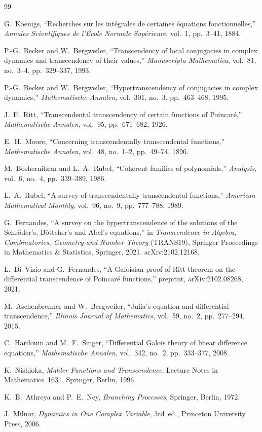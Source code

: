 \documentclass[11pt,a4paper]{article}
\theoremstyle{plain}
\theoremstyle{definition}
\begin{document}
\begin{thebibliography}{99}

G.~Koenigs,
``Recherches sur les int{\'e}grales de certaines {\'e}quations fonctionnelles,''
\textit{Annales Scientifiques de l'{\'E}cole Normale Sup{\'e}rieure},
vol.~1, pp.~3--41, 1884.

P.-G.~Becker and W.~Bergweiler,
``Transcendency of local conjugacies in complex dynamics and transcendency of their values,''
\textit{Manuscripta Mathematica},
vol.~81, no.~3--4, pp.~329--337, 1993.

P.-G.~Becker and W.~Bergweiler,
``Hypertranscendency of conjugacies in complex dynamics,''
\textit{Mathematische Annalen},
vol.~301, no.~3, pp.~463--468, 1995.

J.~F.~Ritt,
``Transcendental transcendency of certain functions of Poincar\'e,''
\textit{Mathematische Annalen},
vol.~95, pp.~671--682, 1926.

E.~H.~Moore,
``Concerning transcendentally transcendental functions,''
\textit{Mathematische Annalen},
vol.~48, no.~1--2, pp.~49--74, 1896.

M.~Boshernitzan and L.~A.~Rubel,
``Coherent families of polynomials,''
\textit{Analysis},
vol.~6, no.~4, pp.~339--389, 1986.

L.~A.~Rubel,
``A survey of transcendentally transcendental functions,''
\textit{American Mathematical Monthly},
vol.~96, no.~9, pp.~777--788, 1989.

G.~Fernandes,
``A survey on the hypertranscendence of the solutions of the Schr\"oder's, B\"ottcher's and Abel's equations,''
in \textit{Transcendence in Algebra, Combinatorics, Geometry and Number Theory} (TRANS19),
Springer Proceedings in Mathematics \& Statistics, Springer, 2021.
arXiv:2102.12168.

L.~Di~Vizio and G.~Fernandes,
``A Galoisian proof of Ritt theorem on the differential transcendence of Poincar\'e functions,''
preprint, arXiv:2102.08268, 2021.

M.~Aschenbrenner and W.~Bergweiler,
``Julia's equation and differential transcendence,''
\textit{Illinois Journal of Mathematics},
vol.~59, no.~2, pp.~277--294, 2015.

C.~Hardouin and M.~F.~Singer,
``Differential Galois theory of linear difference equations,''
\textit{Mathematische Annalen},
vol.~342, no.~2, pp.~333--377, 2008.

K.~Nishioka,
\textit{Mahler Functions and Transcendence},
Lecture Notes in Mathematics~1631, Springer, Berlin, 1996.

K.~B.~Athreya and P.~E.~Ney,
\textit{Branching Processes},
Springer, Berlin, 1972.

J.~Milnor,
\textit{Dynamics in One Complex Variable},
3rd~ed., Princeton University Press, 2006.

\end{thebibliography}
\end{document}
